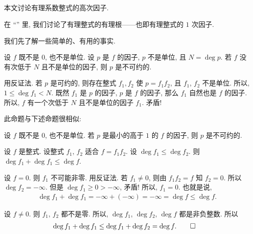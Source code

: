 \subsection*{\FactorsOfHigherDegreeOfPolynomialsOverQ}
\markright{\FactorsOfHigherDegreeOfPolynomialsOverQ}

本文讨论有理系数整式的高次因子.

在 ``\RationalRootsOfPolynomialsOverQ'' 里, 我们讨论了有理整式的有理根——也即有理整式的 $1$ 次因子.

我们先了解一些简单的、有用的事实.

\begin{proposition}
    设 $f$ 既不是 $0$, 也不是单位. 设 $p$ 是 $f$ 的因子, $p$ 不是单位, 且 $N = \deg p$. 若 $f$ 没有次低于 $N$ 且不是单位的因子, 则 $p$ 是不可约的.
\end{proposition}

\begin{pf}
    用反证法. 若 $p$ 是可约的, 则存在整式 $f_1, f_2$ 使 $p = f_1 f_2$, 且 $f_1$, $f_2$ 不是单位. 所以, $1 \leq \deg f_1 < N$. 既然 $f_1$ 是 $p$ 的因子, $p$ 是 $f$ 的因子, 那么 $f_1$ 自然也是 $f$ 的因子. 所以, $f$ 有一个次低于 $N$ 且不是单位的因子 $f_1$. 矛盾!
\end{pf}

\begin{remark}
    此命题与下述命题很相似:

    设 $f$ 既不是 $0$, 也不是单位. 若 $p$ 是最小的高于 $1$ 的 $f$ 的因子, 则 $p$ 是不可约的.
\end{remark}

\begin{proposition}
    设 $f$ 是整式. 设整式 $f_1$, $f_2$ 适合 $f = f_1 f_2$. 设 $\deg f_1 \leq \deg f_2$. 则 $\deg f_1 + \deg f_1 \leq \deg f$.
\end{proposition}

\begin{pf}
    设 $f = 0$. 则 $f_1$ 不可能非零. 用反证法. 若 $f_1 \neq 0$, 则由 $f_1 f_2 = f$ 知 $f_2 = 0$. 所以 $\deg f_2 = -\infty$. 但是 $\deg f_1 \geq 0 > -\infty$, 矛盾! 所以, $f_1 = 0$. 也就是说,
    \begin{align*}
        \deg f_1 + \deg f_1 = -\infty + (-\infty) = -\infty = \deg f \leq \deg f.
    \end{align*}

    设 $f \neq 0$. 则 $f_1$, $f_2$ 都不是零. 所以, $\deg f_1$, $\deg f_2$, $\deg f$ 都是非负整数. 所以
    \begin{align*}
         & \deg f_1 + \deg f_1 \leq \deg f_1 + \deg f_2 = \deg f. \qedhere
    \end{align*}
\end{pf}

